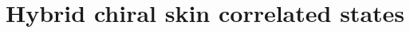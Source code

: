 \documentclass[longbibliography, aps, prx, amsmath, amssymb, amsfonts, twocolumn,superscriptaddress, footinbib]{revtex4-1}
\begin{document}

	\section{Hybrid chiral skin correlated states}
\end{document}
